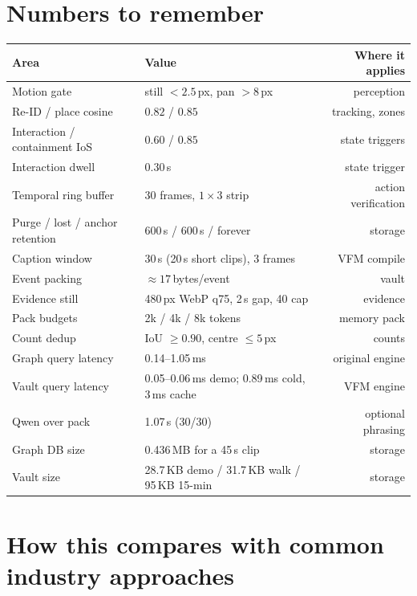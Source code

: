 \documentclass[10pt,a4paper]{article}
\begin{document}
\section{Numbers to remember}

\begin{center}
\small
\begin{tabularx}{\linewidth}{@{}l L r@{}}
\toprule
\textbf{Area} & \textbf{Value} & \textbf{Where it applies} \\
\midrule
Motion gate & still \(<2.5\)\,px, pan \(>8\)\,px & perception \\
Re-ID / place cosine & \(0.82\) / \(0.85\) & tracking, zones \\
Interaction / containment IoS & \(0.60\) / \(0.85\) & state triggers \\
Interaction dwell & \(0.30\)\,s & state trigger \\
Temporal ring buffer & 30 frames, \(1\times3\) strip & action verification \\
Purge / lost / anchor retention & 600\,s / 600\,s / forever & storage \\
Caption window & 30\,s (20\,s short clips), 3 frames & VFM compile \\
Event packing & \(\approx 17\)\,bytes/event & vault \\
Evidence still & 480\,px WebP q75, 2\,s gap, 40 cap & evidence \\
Pack budgets & 2k / 4k / 8k tokens & memory pack \\
Count dedup & IoU \(\geq 0.90\), centre \(\leq 5\)\,px & counts \\
Graph query latency & 0.14--1.05\,ms & original engine \\
Vault query latency & 0.05--0.06\,ms demo; 0.89\,ms cold, 3\,ms cache & VFM engine \\
Qwen over pack & 1.07\,s (30/30) & optional phrasing \\
Graph DB size & 0.436\,MB for a 45\,s clip & storage \\
Vault size & 28.7\,KB demo / 31.7\,KB walk / 95\,KB 15-min & storage \\
\bottomrule
\end{tabularx}
\end{center}

\section{How this compares with common industry approaches}
\end{document}
